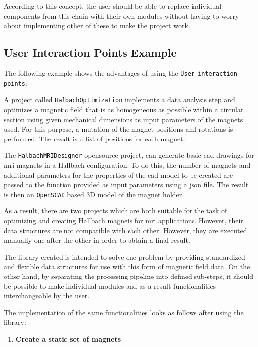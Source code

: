 According to this concept, the user should be able to replace individual
components from this chain with their own modules without having to
worry about implementing other of these to make the project work.

\hypertarget{user-interaction-points-example}{%
\subsection{User Interaction Points
Example}\label{user-interaction-points-example}}

The following example shows the advantages of using the
\passthrough{\lstinline!User interaction points!}:

A project called
\passthrough{\lstinline!HalbachOptimization!}\cite{HalbachOptimization}
implements a data analysis step and optimizes a magnetic field that is
as homogeneous as possible within a circular section using given
mechanical dimensions as input parameters of the magnets used. For this
purpose, a mutation of the magnet positions and rotations is performed.
The result is a list of positions for each magnet.

The
\passthrough{\lstinline!HalbachMRIDesigner!}\cite{HalbachMRIDesigner}
opensource project, can generate basic \gls{cad} drawings for \gls{mri}
magnets in a Hallbach configuration. To do this, the number of magnets
and additional parameters for the properties of the \gls{cad} model to
be created are passed to the function provided as input parameters using
a \gls{json} file. The result is then an
\passthrough{\lstinline!OpenSCAD!}\cite{OpenSCAD} based 3D model of
the magnet holder.

As a result, there are two projects which are both suitable for the task
of optimizing and creating Hallbach magnets for \gls{mri} applications.
However, their data structures are not compatible with each other.
However, they are executed manually one after the other in order to
obtain a final result.

The library created is intended to solve one problem by providing
standardized and flexible data structures for use with this form of
magnetic field data. On the other hand, by separating the processing
pipeline into defined sub-steps, it should be possible to make
individual modules and as a result functionalities interchangeable by
the user.

The implementation of the same functionalities looks as follows after
using the library:

\begin{enumerate}
\def\labelenumi{\arabic{enumi}.}
\tightlist
\item
  \textbf{Create a static set of magnets}
\end{enumerate}

